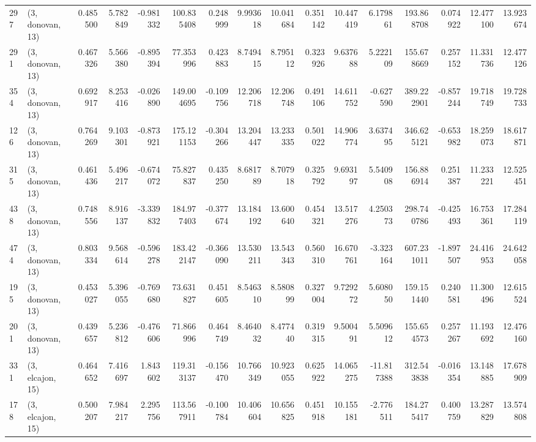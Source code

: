 \begin{tabular}{llrrrrrrrrrrrrrr}
297 &  (3, donovan, 13) &   0.485500 &   5.782849 &  -0.981332 &   100.835408 &   0.248999 &   9.993618 &  10.041684 &  0.351142 &  10.447419 &   6.179861 &   193.868708 &   0.074922 &  12.477100 &  13.923674 \\
291 &  (3, donovan, 13) &   0.467326 &   5.566380 &  -0.895394 &    77.353996 &   0.423883 &   8.749415 &   8.795112 &  0.323926 &   9.637688 &   5.222109 &   155.678669 &   0.257152 &  11.331736 &  12.477126 \\
354 &  (3, donovan, 13) &   0.692917 &   8.253416 &  -0.026890 &   149.004695 &  -0.109756 &  12.206718 &  12.206748 &  0.491106 &  14.611752 &  -0.627590 &   389.222901 &  -0.857244 &  19.718749 &  19.728733 \\
126 &  (3, donovan, 13) &   0.764269 &   9.103301 &  -0.873921 &   175.121153 &  -0.304266 &  13.204447 &  13.233335 &  0.501022 &  14.906774 &   3.637495 &   346.625121 &  -0.653982 &  18.259073 &  18.617871 \\
315 &  (3, donovan, 13) &   0.461436 &   5.496217 &  -0.674072 &    75.827837 &   0.435250 &   8.681789 &   8.707918 &  0.325792 &   9.693197 &   5.540908 &   156.886914 &   0.251387 &  11.233221 &  12.525451 \\
438 &  (3, donovan, 13) &   0.748556 &   8.916137 &  -3.339832 &   184.977403 &  -0.377674 &  13.184192 &  13.600640 &  0.454321 &  13.517276 &   4.250373 &   298.740786 &  -0.425493 &  16.753361 &  17.284119 \\
474 &  (3, donovan, 13) &   0.803334 &   9.568614 &  -0.596278 &   183.422147 &  -0.366090 &  13.530211 &  13.543343 &  0.560310 &  16.670761 &  -3.323164 &   607.231011 &  -1.897507 &  24.416953 &  24.642058 \\
195 &  (3, donovan, 13) &   0.453027 &   5.396055 &  -0.769680 &    73.631827 &   0.451605 &   8.546310 &   8.580899 &  0.327004 &   9.729272 &   5.608050 &   159.151440 &   0.240581 &  11.300496 &  12.615524 \\
201 &  (3, donovan, 13) &   0.439657 &   5.236812 &  -0.476606 &    71.866996 &   0.464749 &   8.464032 &   8.477440 &  0.319315 &   9.500491 &   5.509612 &   155.654573 &   0.257267 &  11.193692 &  12.476160 \\
331 &  (3, elcajon, 15) &   0.464652 &   7.416697 &   1.843602 &   119.313137 &  -0.156470 &  10.766349 &  10.923055 &  0.625922 &  14.065275 & -11.817388 &   312.543838 &  -0.016354 &  13.148885 &  17.678909 \\
178 &  (3, elcajon, 15) &   0.500207 &   7.984217 &   2.295756 &   113.567911 &  -0.100784 &  10.406604 &  10.656825 &  0.451918 &  10.155181 &  -2.776511 &   184.275417 &   0.400759 &  13.287829 &  13.574808 \\

\end{tabular}
